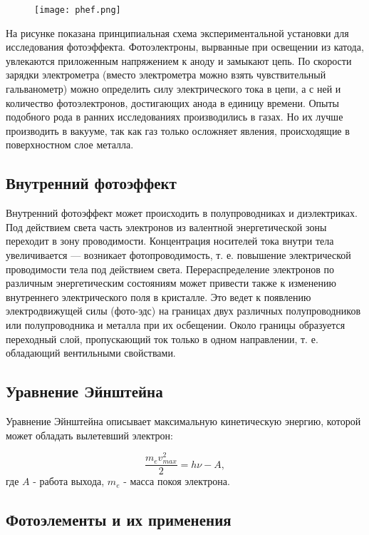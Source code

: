 \begin{figure}[h!]
    \centering
    \texttt{[image: phef.png]}
    \label{fig:my_label}
\end{figure} 

На рисунке показана принципиальная схема экспериментальной установки для исследования фотоэффекта. Фотоэлектроны, вырванные при освещении из катода, увлекаются приложенным напряжением к аноду и замыкают цепь. По скорости зарядки электрометра (вместо электрометра можно взять чувствительный гальванометр) можно определить силу электрического тока в цепи, а с ней и количество фотоэлектронов, достигающих анода в единицу времени. Опыты подобного рода в ранних исследованиях производились в газах. Но их лучше производить в вакууме, так как газ только осложняет явления, происходящие в поверхностном слое металла.

\subsection{Внутренний фотоэффект}

Внутренний фотоэффект может происходить в полупроводниках и диэлектриках. Под действием света часть электронов из валентной энергетической зоны переходит в зону проводимости. Концентрация носителей тока внутри тела увеличивается — возникает фотопроводимость, т. е. повышение электрической проводимости тела под действием света. Перераспределение электронов по различным энергетическим состояниям может привести также к изменению внутреннего электрического поля в кристалле. Это ведет к появлению электродвижущей силы (фото-эдс) на границах двух различных полупроводников или полупроводника и металла при их осбещении. Около границы образуется переходный слой, пропускающий ток только в одном направлении, т. е. обладающий вентильными свойствами.


\subsection{Уравнение Эйнштейна}

Уравнение Эйнштейна описывает максимальную кинетическую энергию, которой может обладать вылетевший электрон:

\begin{equation*}
    \frac{m_ev^2_{max}}{2} = h\nu - A,
\end{equation*}
где $A$ - работа выхода, $m_e$ - масса покоя электрона.
\subsection{Фотоэлементы и их применения}

